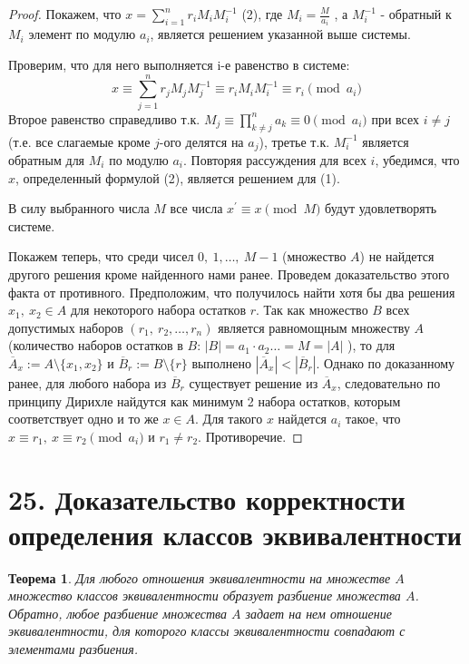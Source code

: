 \documentclass[a4paper,12pt]{article}
\newtheorem*{theorem}{Теорема}
\newcommand{\p}{^{\prime}}
\begin{document}
        \begin{proof}
            Покажем, что $ x=\sum _{i=1}^{n}r_{i}M_{i}M_{i}^{-1}$ (2), 
            где $ M_{i}={\frac {M}{a_{i}}}$ , а $ M_{i}^{-1} $  - обратный к $ M_{i}$  элемент по модулю $a_{i}$, является решением указанной выше системы.

            Проверим, что для него выполняется i-е равенство в системе: 
            $$ x\equiv \sum _{j=1}^{n} r_{j} M_{j} M_{j}^{-1}
                \equiv r_{i}M_{i} M_{i}^{-1}
                \equiv r_{i}{\pmod {a_{i}}} $$
            Второе равенство справедливо т.к.
            $ M_{j}\equiv \prod_{k\neq j}^{n} a_{k}
                    \equiv 0{\pmod {a_{i}}}$ 
            при всех $ i\neq j$ (т.е. все слагаемые кроме $j$-ого делятся на $a_j$), третье т.к. $ M_{i}^{-1} $ является обратным для $ M_{i} $ по модулю $a_{i} $. Повторяя рассуждения для всех $i$, убедимся, что $x$, определенный формулой (2), является решением для (1).

            В силу выбранного числа $M$ все числа $x\p\equiv x{\pmod  M}$ будут удовлетворять системе.

            Покажем теперь, что среди чисел $0,\ 1, \dots,\ M-1$ (множество $A$) не найдется другого решения кроме найденного нами ранее. 
            Проведем доказательство этого факта от противного. 
            Предположим, что получилось найти хотя бы два решения $x_{1},\ x_{2}\in A$ для некоторого набора остатков $r$. Так как множество $B$ всех допустимых наборов 
            $ (r_{1},\ r_{2},\dots ,r_{n}) $ является равномощным множеству $ A $ (количество наборов остатков в $B$: $|B| = a_1 \cdot a_2 \ldots = M = |A|$ ), 
            то для $\overline A_{x}:=A\setminus \{x_{1},x_{2}\} $ 
            и 
            $ \overline B_{r}:=B\setminus \{r\}$ выполнено 
            $|\overline A_{x}|<|\overline B_{r}|$. Однако по доказанному ранее, 
            для любого набора из $ \overline B_{r} $ существует решение из $ \overline A_{x}$, следовательно по принципу Дирихле найдутся как минимум 2 набора остатков, которым соответствует одно и то же $x\in A$. Для такого $ x $ найдется $ a_{i} $ такое, что 
            $x\equiv r_{1},\ x\equiv r_{2}{\pmod  {a_{i}}}$ и $r_{1}\neq r_{2}$. Противоречие.

        \end{proof}
        \section*{25. Доказательство корректности определения классов эквивалентности}
        \begin{theorem}
            Для любого отношения эквивалентности на множестве $A$ множество классов эквивалентности образует разбиение множества $A$. Обратно, любое разбиение множества $A$ задает на нем отношение эквивалентности, для которого классы эквивалентности совпадают с элементами разбиения.
        \end{theorem}
\end{document}
